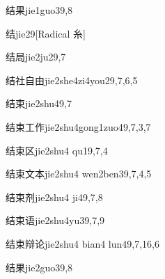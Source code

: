 \begin{verbete}{结果}{jie1guo3}{9,8}
\end{verbete}

\begin{verbete}{结}{jie2}{9}[Radical 糸]
\end{verbete}

\begin{verbete}{结局}{jie2ju2}{9,7}
\end{verbete}

\begin{verbete}{结社自由}{jie2she4zi4you2}{9,7,6,5}
\end{verbete}

\begin{verbete}{结束}{jie2shu4}{9,7}
\end{verbete}

\begin{verbete}{结束工作}{jie2shu4gong1zuo4}{9,7,3,7}
\end{verbete}

\begin{verbete}{结束区}{jie2shu4 qu1}{9,7,4}
\end{verbete}

\begin{verbete}{结束文本}{jie2shu4 wen2ben3}{9,7,4,5}
\end{verbete}

\begin{verbete}{结束剂}{jie2shu4 ji4}{9,7,8}
\end{verbete}

\begin{verbete}{结束语}{jie2shu4yu3}{9,7,9}
\end{verbete}

\begin{verbete}{结束辩论}{jie2shu4 bian4 lun4}{9,7,16,6}
\end{verbete}

\begin{verbete}{结果}{jie2guo3}{9,8}
\end{verbete}

